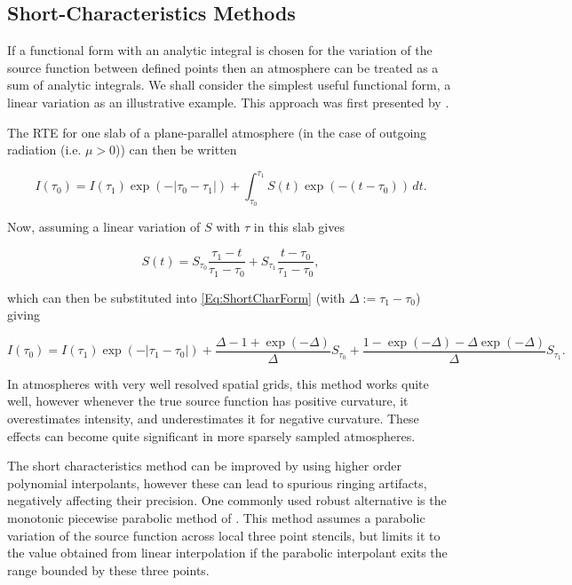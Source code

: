 \subsection{Short-Characteristics Methods}\label{Sec:ShortChar}

If a functional form with an analytic integral is chosen for the variation of the source function between defined points then an atmosphere can be treated as a sum of analytic integrals. We shall consider the simplest useful functional form, a linear variation as an illustrative example.
This approach was first presented by \citet{Olson1987}.

The RTE for one slab of a plane-parallel atmosphere (in the case of outgoing radiation (i.e. $\mu > 0$)) can then be written

\begin{equation}
    I(\tau_0) = I(\tau_1) \exp(- |\tau_0 - \tau_1|) + \int_{\tau_0}^{\tau_1} S(t) \exp(-(t - \tau_0))\, dt.
    \label{Eq:ShortCharForm}
\end{equation}

Now, assuming a linear variation of $S$ with $\tau$ in this slab gives

\begin{equation}
    S(t) = S_{\tau_0} \frac{\tau_1-t}{\tau_1-\tau_0} + S_{\tau_1} \frac{t-\tau_0}{\tau_1-\tau_0},
\end{equation}

which can then be substituted into \eqref{Eq:ShortCharForm} (with $\Delta := \tau_1 - \tau_0$) giving

\begin{equation}
    I(\tau_0) = I(\tau_1) \exp(- |\tau_1 - \tau_0|) +
    \frac{\Delta - 1 + \exp(-\Delta)}{\Delta} S_{\tau_0} +
    \frac{1 - \exp(-\Delta) - \Delta\exp(-\Delta)}{\Delta} S_{\tau_1}.
\end{equation}

In atmospheres with very well resolved spatial grids, this method works quite well, however whenever the true source function has positive curvature, it overestimates intensity, and underestimates it for negative curvature. These effects can become quite significant in more sparsely sampled atmospheres.

The short characteristics method can be improved by using higher order polynomial interpolants, however these can lead to spurious ringing artifacts, negatively affecting their precision. One commonly used robust alternative is the monotonic piecewise parabolic method of \citet{Auer1994}. This method assumes a parabolic variation of the source function across local three point stencils, but limits it to the value obtained from linear interpolation if the parabolic interpolant exits the range bounded by these three points.

